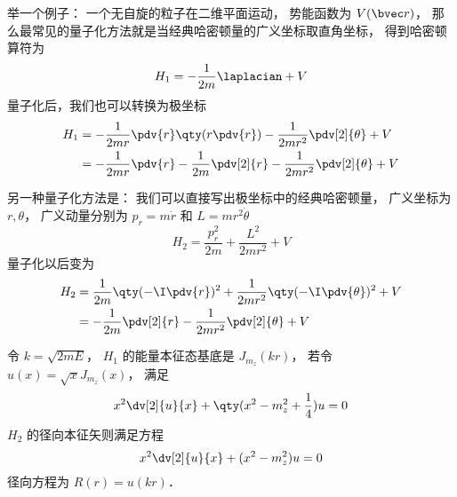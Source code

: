 
\begin{issues}
\issueDraft
\end{issues}

举一个例子： 一个无自旋的粒子在二维平面运动， 势能函数为 $V(\bvec r)$， 那么最常见的量子化方法就是当经典哈密顿量的广义坐标取直角坐标， 得到哈密顿算符为
\begin{equation}
H_1 = -\frac{1}{2m} \laplacian + V
\end{equation}
量子化后，我们也可以转换为极坐标
\begin{equation}
\begin{aligned}
H_1 &= -\frac{1}{2mr}\pdv{r}\qty(r \pdv{r}) - \frac{1}{2mr^2} \pdv[2]{\theta} + V\\
&= -\frac{1}{2mr}\pdv{r} -\frac{1}{2m}\pdv[2]{r} - \frac{1}{2mr^2} \pdv[2]{\theta} + V
\end{aligned}
\end{equation}

另一种量子化方法是： 我们可以直接写出极坐标中的经典哈密顿量， 广义坐标为 $r, \theta$， 广义动量分别为 $p_r = m\dot r$ 和 $L = mr^2\dot\theta$
\begin{equation}
H_2 = \frac{p_r^2}{2m} + \frac{L^2}{2mr^2} + V
\end{equation}
量子化以后变为
\begin{equation}
\begin{aligned}
H_2 &= \frac{1}{2m}\qty(-\I\pdv{r})^2 + \frac{1}{2mr^2}\qty(-\I\pdv{\theta})^2 + V\\
&= -\frac{1}{2m}\pdv[2]{r} - \frac{1}{2mr^2} \pdv[2]{\theta} + V
\end{aligned}
\end{equation}


令 $k = \sqrt{2mE}$， $H_1$ 的能量本征态基底是 $J_{m_z}(kr)$， 若令 $u(x) = \sqrt{x}J_{m_z}(x)$， 满足
\begin{equation}
x^2 \dv[2]{u}{x} + \qty(x^2 - m_z^2 + \frac{1}{4}) u = 0
\end{equation}
$H_2$ 的径向本征矢则满足方程
\begin{equation}
x^2 \dv[2]{u}{x} + (x^2 - m_z^2)u = 0
\end{equation}
径向方程为 $R(r) = u(kr)$．
